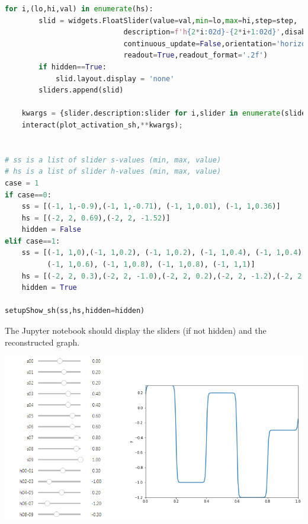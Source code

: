 \begin{lstlisting}[language=Python]
    for i,(lo,hi,val) in enumerate(hs):
        slid = widgets.FloatSlider(value=val,min=lo,max=hi,step=step,
                            description=f'h{2*i:02d}-{2*i+1:02d}',disabled=False,
                            continuous_update=False,orientation='horizontal',
                            readout=True,readout_format='.2f')
        if hidden==True:
            slid.layout.display = 'none'
        sliders.append(slid)

    kwargs = {slider.description:slider for i,slider in enumerate(sliders)}
    interact(plot_activation_sh,**kwargs);

    
# ss is a list of slider s-values (min, max, value)
# hs is a list of slider h-values (min, max, value)
case = 1
if case==0:
    ss = [(-1, 1,-0.9),(-1, 1,-0.71), (-1, 1,0.01), (-1, 1,0.36)]
    hs = [(-2, 2, 0.69),(-2, 2, -1.52)]
    hidden = False
elif case==1:
    ss = [(-1, 1,0),(-1, 1,0.2), (-1, 1,0.2), (-1, 1,0.4), (-1, 1,0.4), (-1, 1,0.6), 
          (-1, 1,0.6), (-1, 1,0.8), (-1, 1,0.8), (-1, 1,1)]
    hs = [(-2, 2, 0.3),(-2, 2, -1.0),(-2, 2, 0.2),(-2, 2, -1.2),(-2, 2, -0.3)]
    hidden = True

setupShow_sh(ss,hs,hidden=hidden)    
\end{lstlisting}

The Jupyter notebook should display the sliders (if not hidden) and the reconstructed graph.

{\centering \includegraphics[width=\textwidth,]{pic/wigglyfn21} \par}

